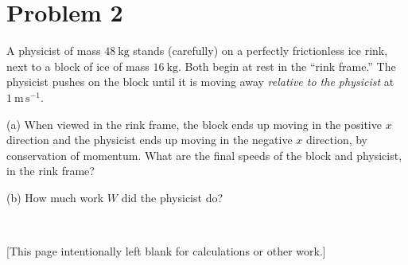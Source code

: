 \documentclass[12pt]{article}
\begin{document}
\clearpage

\section*{Problem 2}

A physicist of mass $48~\mathrm{kg}$ stands (carefully) on a perfectly
frictionless ice rink, next to a block of ice of mass
$16~\mathrm{kg}$.  Both begin at rest in the ``rink frame.''  The
physicist pushes on the block until it is moving away \emph{relative
to the physicist} at $1~\mathrm{m\,s^{-1}}$.

(a) When viewed in the rink frame, the block ends up moving in the
positive $x$ direction and the physicist ends up moving in the
negative $x$ direction, by conservation of momentum.  What are the
final speeds of the block and physicist, in the rink frame?

\vfill

(b) How much work $W$ did the physicist do?

\vfill ~

\clearpage

[This page intentionally left blank for calculations or other work.]
\end{document}
